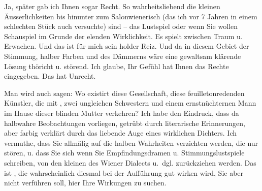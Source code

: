 \pstart
           Ja, später gab ich Ihnen sogar Recht. So wahrheitsliebend die kleinen
               Äusserlichkeiten bis hinunter zum Salonwienerisch
               (das ich vor 7 Jahren in einem schlechten Stück auch versuchte) sind – das Lustspiel oder wenn Sie
               wollen {\pb}Schauspiel \label{K_L03823-7v}\label{K_L03823-7} im Grunde der elenden Wirklichkeit.
               Es spielt zwischen Traum u. Erwachen. Und das ist für mich sein holder Reiz. Und da
               in diesem Gebiet der Stimmung, halber Farben und des Dämmerns wäre eine gewaltsam
               klärende Lösung thöricht u. störend. Ich glaube, Ihr Gefühl hat Ihnen das Rechte
               eingegeben. Das \label{K_L03823-8v}\label{K_L03823-8} hat Unrecht.\pend
           
\pstart
           Man wird auch sagen: Wo existirt diese Gesellschaft, diese feuilletonredenden
               Künstler, die mit \label{K_L03823-9v}\label{K_L03823-9}, zwei ungleichen Schwestern und einem ernstnüchternen Mann
               im Hause dieser blinden Mutter verkehren? Ich habe den Eindruck, dass da halbwahre
               Beobachtungen vorliegen, getrübt durch literarische Erinnerungen, aber farbig
               verklärt durch das liebende Auge eines wirklichen Dichters. Ich vermuthe, dass Sie
               allmälig auf die halben Wahrheiten verzichten werden, die nur stören, {\pb}u. dass Sie sich wenn Sie
               Empfindungsdramen u. Stimmungslustspiele schreiben,  von den kleinen \label{K_L03823-10v}\label{K_L03823-10} des Wiener Dialects u. dgl. zurückziehen werden. Das ist \label{K_L03823-11v}\label{K_L03823-11}, die wahrscheinlich diesmal bei der Aufführung
               gut wirken wird, Sie aber nicht verführen soll, hier Ihre Wirkungen zu suchen.\pend
           
